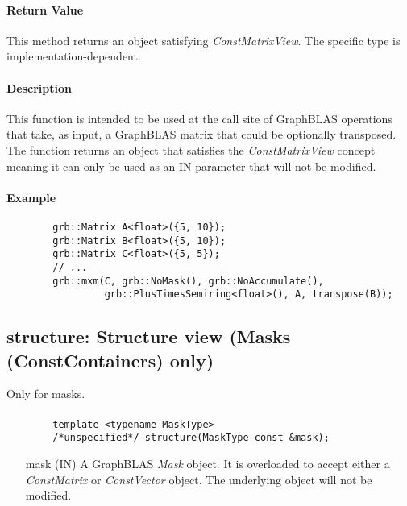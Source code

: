 \paragraph{Return Value}

This method returns an object satisfying \emph{ConstMatrixView}.  The specific type is
implementation-dependent.

\paragraph{Description}

This function is intended to be used at the call site of GraphBLAS operations that take, 
as input, a GraphBLAS matrix that could be optionally transposed.  The function returns an
object that satisfies the \emph{ConstMatrixView} concept meaning it can only be used as an
{\sf IN} parameter that will not be modified.

\paragraph{Example}

\begin{verbatim}
        grb::Matrix A<float>({5, 10});
        grb::Matrix B<float>({5, 10});
        grb::Matrix C<float>({5, 5});
        // ...
        grb::mxm(C, grb::NoMask(), grb::NoAccumulate(), 
                 grb::PlusTimesSemiring<float>(), A, transpose(B));
\end{verbatim}


\subsection{{\sf structure}: Structure view (Masks (ConstContainers) only)}

Only for masks.  

\paragraph{\syntax}

\begin{verbatim}
        template <typename MaskType>
        /*unspecified*/ structure(MaskType const &mask);
\end{verbatim}

\begin{itemize}%
    \item[{\sf mask}] ({\sf IN}) A GraphBLAS \emph{Mask} object. It is 
    overloaded to accept either a \emph{ConstMatrix} or \emph{ConstVector} 
    object.  The underlying object will not be modified.
\end{itemize}


